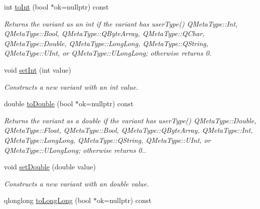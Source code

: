 \begin{DoxyCompactItemize}
\item 
int \mbox{\hyperlink{class_variant_ae38d113834d5d53ca9c7f36366a25288}{to\+Int}} (bool $\ast$ok=nullptr) const
\begin{DoxyCompactList}\small\item\em Returns the variant as an int if the variant has user\+Type() Q\+Meta\+Type\+::\+Int, Q\+Meta\+Type\+::\+Bool, Q\+Meta\+Type\+::\+Q\+Byte\+Array, Q\+Meta\+Type\+::\+Q\+Char, Q\+Meta\+Type\+::\+Double, Q\+Meta\+Type\+::\+Long\+Long, Q\+Meta\+Type\+::\+Q\+String, Q\+Meta\+Type\+::\+U\+Int, or Q\+Meta\+Type\+::\+U\+Long\+Long; otherwise returns 0. \end{DoxyCompactList}\item 
\mbox{\label{class_variant_aa4fe139cfa2b949c68fd2cc61118dd12}} 
void \mbox{\hyperlink{class_variant_aa4fe139cfa2b949c68fd2cc61118dd12}{set\+Int}} (int value)
\begin{DoxyCompactList}\small\item\em Constructs a new variant with an int value. \end{DoxyCompactList}\item 
double \mbox{\hyperlink{class_variant_a543a5e6579cea7fcd8e6413921e8fd44}{to\+Double}} (bool $\ast$ok=nullptr) const
\begin{DoxyCompactList}\small\item\em Returns the variant as a double if the variant has user\+Type() Q\+Meta\+Type\+::\+Double, Q\+Meta\+Type\+::\+Float, Q\+Meta\+Type\+::\+Bool, Q\+Meta\+Type\+::\+Q\+Byte\+Array, Q\+Meta\+Type\+::\+Int, Q\+Meta\+Type\+::\+Long\+Long, Q\+Meta\+Type\+::\+Q\+String, Q\+Meta\+Type\+::\+U\+Int, or Q\+Meta\+Type\+::\+U\+Long\+Long; otherwise returns 0.. \end{DoxyCompactList}\item 
\mbox{\label{class_variant_a9cf99c99f688ecafaf0ccfe1fb6aee52}} 
void \mbox{\hyperlink{class_variant_a9cf99c99f688ecafaf0ccfe1fb6aee52}{set\+Double}} (double value)
\begin{DoxyCompactList}\small\item\em Constructs a new variant with an double value. \end{DoxyCompactList}\item 
qlonglong \mbox{\hyperlink{class_variant_ad6c7084a71cb3189d302160a160bb36b}{to\+Long\+Long}} (bool $\ast$ok=nullptr) const

\end{DoxyCompactItemize}
